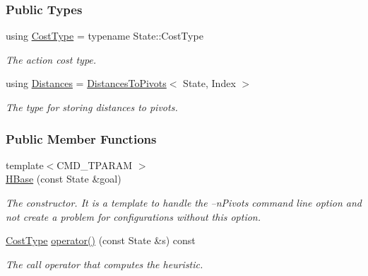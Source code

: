 \subsubsection*{Public Types}
\begin{DoxyCompactItemize}
\item 
using \hyperlink{structslb_1_1ext_1_1heuristic_1_1differential_1_1HBase_aef5c049026cfd3aeabd2b15d97fbbd1f}{Cost\+Type} = typename State\+::\+Cost\+Type\hypertarget{structslb_1_1ext_1_1heuristic_1_1differential_1_1HBase_aef5c049026cfd3aeabd2b15d97fbbd1f}{}\label{structslb_1_1ext_1_1heuristic_1_1differential_1_1HBase_aef5c049026cfd3aeabd2b15d97fbbd1f}

\begin{DoxyCompactList}\small\item\em The action cost type. \end{DoxyCompactList}\item 
using \hyperlink{structslb_1_1ext_1_1heuristic_1_1differential_1_1HBase_a616a127e34765bea6c069fc3faa4aafb}{Distances} = \hyperlink{structslb_1_1ext_1_1heuristic_1_1differential_1_1DistancesToPivots}{Distances\+To\+Pivots}$<$ State, Index $>$\hypertarget{structslb_1_1ext_1_1heuristic_1_1differential_1_1HBase_a616a127e34765bea6c069fc3faa4aafb}{}\label{structslb_1_1ext_1_1heuristic_1_1differential_1_1HBase_a616a127e34765bea6c069fc3faa4aafb}

\begin{DoxyCompactList}\small\item\em The type for storing distances to pivots. \end{DoxyCompactList}\end{DoxyCompactItemize}
\subsubsection*{Public Member Functions}
\begin{DoxyCompactItemize}
\item 
{\footnotesize template$<$C\+M\+D\+\_\+\+T\+P\+A\+R\+AM $>$ }\\\hyperlink{structslb_1_1ext_1_1heuristic_1_1differential_1_1HBase_ad75b1c656e17ff1446ce5356930ebef8}{H\+Base} (const State \&goal)
\begin{DoxyCompactList}\small\item\em The constructor. It is a template to handle the --n\+Pivots command line option and not create a problem for configurations without this option. \end{DoxyCompactList}\item 
\hyperlink{structslb_1_1ext_1_1heuristic_1_1differential_1_1HBase_aef5c049026cfd3aeabd2b15d97fbbd1f}{Cost\+Type} \hyperlink{structslb_1_1ext_1_1heuristic_1_1differential_1_1HBase_ae8896ffe8943d1c6882babd7d4e724a3}{operator()} (const State \&s) const 
\begin{DoxyCompactList}\small\item\em The call operator that computes the heuristic. \end{DoxyCompactList}\end{DoxyCompactItemize}
